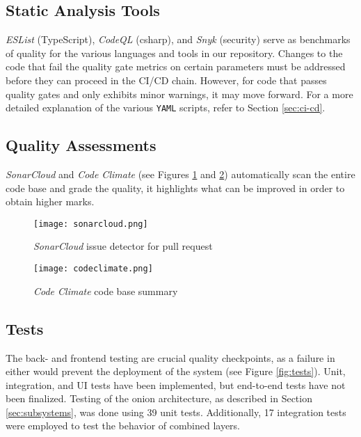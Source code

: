 \subsection{Static Analysis Tools}

\textit{ESList} (TypeScript), \textit{CodeQL} (csharp), and \textit{Snyk} (security) serve as benchmarks of quality for the various languages and tools in our repository. Changes to the code that fail the quality gate metrics on certain parameters must be addressed before they can proceed in the CI/CD chain. However, for code that passes quality gates and only exhibits minor warnings, it may move forward. For a more detailed explanation of the various \texttt{YAML} scripts, refer to Section \ref{sec:ci-cd}.

\subsection{Quality Assessments}

\textit{SonarCloud} and \textit{Code Climate} (see Figures \ref{fig:sonarcloud} and \ref{fig:codeclimate}) automatically scan the entire code base and grade the quality, it highlights what can be improved in order to obtain higher marks.

\begin{figure}[H]
    \centering
    \texttt{[image: sonarcloud.png]}
    \caption{\textit{SonarCloud} issue detector for pull request}
    \label{fig:sonarcloud}
\end{figure}

\begin{figure}[H]
    \centering
    \texttt{[image: codeclimate.png]}
    \caption{\textit{Code Climate} code base summary}
    \label{fig:codeclimate}
\end{figure}

\subsection{Tests}

The back- and frontend testing are crucial quality checkpoints, as a failure in either would prevent the deployment of the system (see Figure \ref{fig:tests}). Unit, integration, and UI tests have been implemented, but end-to-end tests have not been finalized. Testing of the onion architecture, as described in Section \ref{sec:subsystems}, was done using 39 unit tests. Additionally, 17 integration tests were employed to test the behavior of combined layers.

